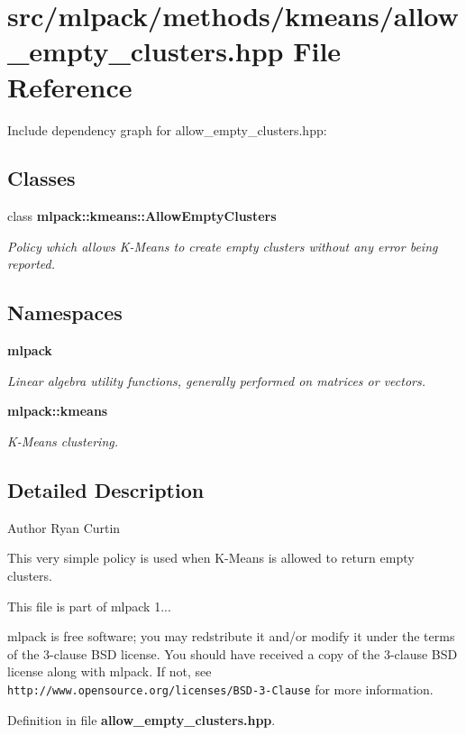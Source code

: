 \section{src/mlpack/methods/kmeans/allow\-\_\-empty\-\_\-clusters.hpp File Reference}
\label{allow__empty__clusters_8hpp}
Include dependency graph for allow\-\_\-empty\-\_\-clusters.\-hpp\-:
\subsection*{Classes}
\begin{DoxyCompactItemize}
\item 
class {\bf mlpack\-::kmeans\-::\-Allow\-Empty\-Clusters}
\begin{DoxyCompactList}\small\item\em Policy which allows K-\/\-Means to create empty clusters without any error being reported. \end{DoxyCompactList}\end{DoxyCompactItemize}
\subsection*{Namespaces}
\begin{DoxyCompactItemize}
\item 
{\bf mlpack}
\begin{DoxyCompactList}\small\item\em Linear algebra utility functions, generally performed on matrices or vectors. \end{DoxyCompactList}\item 
{\bf mlpack\-::kmeans}
\begin{DoxyCompactList}\small\item\em K-\/\-Means clustering. \end{DoxyCompactList}\end{DoxyCompactItemize}


\subsection{Detailed Description}
\begin{DoxyAuthor}{Author}
Ryan Curtin
\end{DoxyAuthor}
This very simple policy is used when K-\/\-Means is allowed to return empty clusters.

This file is part of mlpack 1...

mlpack is free software; you may redstribute it and/or modify it under the terms of the 3-\/clause B\-S\-D license. You should have received a copy of the 3-\/clause B\-S\-D license along with mlpack. If not, see {\tt http\-://www.\-opensource.\-org/licenses/\-B\-S\-D-\/3-\/\-Clause} for more information. 

Definition in file {\bf allow\-\_\-empty\-\_\-clusters.\-hpp}.

